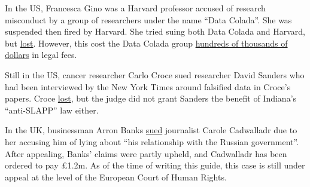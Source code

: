 \documentclass[letterpaper, 12pt]{article}
\begin{document}
In the US, Francesca Gino was a Harvard professor accused of research misconduct by a group of researchers under the name ``Data Colada''.
She was suspended then fired by Harvard. She tried suing both Data Colada and Harvard, but \href{https://reason.com/volokh/2024/09/11/prof-francesca-ginos-libel-claims-against-harvard-business-school-and-data-colada-dismissed/}{lost}.
However, this cost the Data Colada group \href{https://www.vox.com/future-perfect/23841742/francesca-gino-data-colada-lawsuit-gofundme-science-culture-transparency-academic-fraud-dishonesty}{hundreds of thousands of dollars} in legal fees.

Still in the US, cancer researcher Carlo Croce sued researcher David Sanders who had been interviewed by the New York Times around falsified data in Croce's papers. Croce \href{https://retractionwatch.com/2020/05/13/cancer-researcher-loses-defamation-suit-against-critic/}{lost}, but the judge did not grant Sanders the benefit of Indiana's ``anti-SLAPP'' law either.

In the UK, businessman Arron Banks \href{https://www.bbc.com/news/uk-65644475}{sued} journalist Carole Cadwalladr due to her accusing him of lying about ``his relationship with the Russian government''.
After appealing, Banks' claims were partly upheld, and Cadwalladr has been ordered to pay £1.2m.
As of the time of writing this guide, this case is still under appeal at the level of the European Court of Human Rights.
\end{document}
